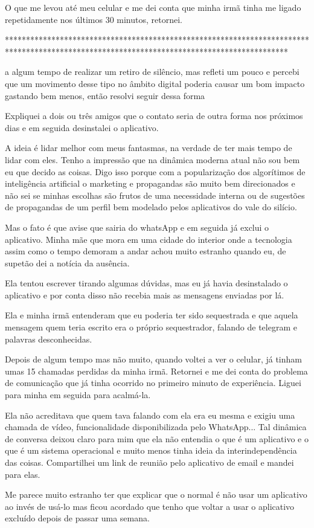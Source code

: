 O que me levou até meu celular e me dei conta que minha irmã tinha me ligado repetidamente nos últimos 30 minutos, retornei.






*******************************************************************************************************************************************



 a algum tempo de realizar um retiro de silêncio, mas refleti um pouco e percebi que um movimento desse tipo no âmbito digital poderia causar um bom impacto gastando bem menos, então resolvi seguir dessa forma

Expliquei a dois ou três amigos que o contato seria de outra forma nos próximos dias e em seguida desinstalei o aplicativo.

A ideia é lidar melhor com meus fantasmas, na verdade de ter mais tempo de lidar com eles. Tenho a impressão que na dinâmica moderna atual não sou bem eu que decido as coisas. Digo isso porque com a popularização dos algorítimos de inteligência artificial o marketing e propagandas são muito bem direcionados e não sei se minhas escolhas são frutos de uma necessidade interna ou de sugestões de propagandas de um perfil bem modelado pelos aplicativos do vale do silício.

Mas o fato é que avise que sairia do whatsApp e em seguida já exclui o aplicativo. Minha mãe que mora em uma cidade do interior onde a tecnologia assim como o tempo demoram a andar achou muito estranho quando eu, de supetão dei a notícia da ausência.

Ela tentou escrever tirando algumas dúvidas, mas eu já havia desinstalado o aplicativo e por conta disso não recebia mais as mensagens enviadas por lá.

Ela e minha irmã entenderam que eu poderia ter sido sequestrada e que aquela mensagem quem teria escrito era o próprio sequestrador, falando de telegram e palavras desconhecidas.

Depois de algum tempo mas não muito, quando voltei a ver o celular, já tinham umas 15 chamadas perdidas da minha irmã. Retornei e me dei conta do problema de comunicação que já tinha ocorrido no primeiro minuto de experiência. Liguei para minha em seguida para acalmá-la. 

Ela não acreditava que quem tava falando com ela era eu mesma e exigiu uma chamada de vídeo, funcionalidade disponibilizada pelo WhatsApp... Tal dinâmica de conversa deixou claro para mim que ela não entendia o que é um aplicativo e o que é um sistema operacional e muito menos tinha ideia da interindependência das coisas. Compartilhei um link de reunião pelo aplicativo de email e mandei para elas.

Me parece muito estranho ter que explicar que o normal é não usar um aplicativo ao invés de usá-lo mas ficou acordado que tenho que voltar a usar o aplicativo excluído depois de passar uma semana. 